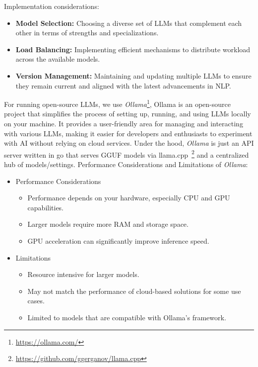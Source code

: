 Implementation considerations:
\begin{itemize}
    \item \textbf{Model Selection:} Choosing a diverse set of LLMs that complement each other in terms of strengths and specializations.
    \item \textbf{Load Balancing:} Implementing efficient mechanisms to distribute workload across the available models.
    \item \textbf{Version Management:} Maintaining and updating multiple LLMs to ensure they remain current and aligned with the latest advancements in NLP.
\end{itemize}

For running open-source LLMs, we use \textit{Ollama}\footnote{\url{https://ollama.com/}}, Ollama is an open-source project that simplifies the process of setting up, running, and using LLMs locally on your machine.
It provides a user-friendly area for managing and interacting with various LLMs, making it easier for developers and enthusiasts to experiment with AI without relying on cloud services.
Under the hood, \textit{Ollama} is just an API server written in go that serves GGUF models via llama.cpp~\footnote{\url{https://github.com/ggerganov/llama.cpp}} and a centralized hub of models/settings.
Performance Considerations and Limitations of \textit{Ollama}:
\begin{itemize}
    \item Performance Considerations
    \begin{itemize}
        \item Performance depends on your hardware, especially CPU and GPU capabilities.
        \item Larger models require more RAM and storage space.
        \item GPU acceleration can significantly improve inference speed.
    \end{itemize}
    \item Limitations
    \begin{itemize}
        \item Resource intensive for larger models.
        \item May not match the performance of cloud-based solutions for some use cases.
        \item Limited to models that are compatible with Ollama's framework.
    \end{itemize}
\end{itemize}


